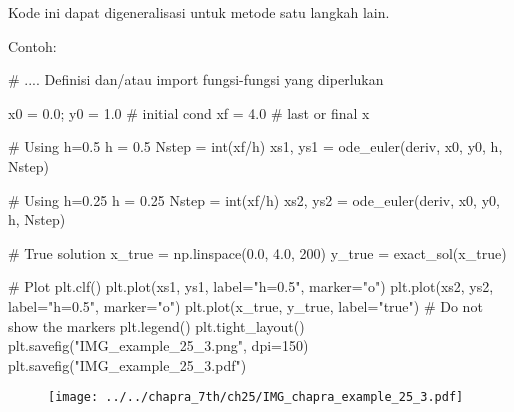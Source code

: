 Kode ini dapat digeneralisasi untuk metode satu langkah lain.

Contoh:
\begin{pythoncode}
# .... Definisi dan/atau import fungsi-fungsi yang diperlukan

x0 = 0.0; y0 = 1.0 # initial cond
xf = 4.0 # last or final x

# Using h=0.5
h = 0.5
Nstep = int(xf/h)
xs1, ys1 = ode_euler(deriv, x0, y0, h, Nstep)

# Using h=0.25
h = 0.25
Nstep = int(xf/h)
xs2, ys2 = ode_euler(deriv, x0, y0, h, Nstep)

# True solution
x_true = np.linspace(0.0, 4.0, 200)
y_true = exact_sol(x_true)

# Plot
plt.clf()
plt.plot(xs1, ys1, label="h=0.5", marker="o")
plt.plot(xs2, ys2, label="h=0.5", marker="o")
plt.plot(x_true, y_true, label="true") # Do not show the markers
plt.legend()
plt.tight_layout()
plt.savefig("IMG_example_25_3.png", dpi=150)
plt.savefig("IMG_example_25_3.pdf")
\end{pythoncode}

\begin{figure}[h]
{\centering
\texttt{[image: ../../chapra\_7th/ch25/IMG\_chapra\_example\_25\_3.pdf]}
\par}
\end{figure}

